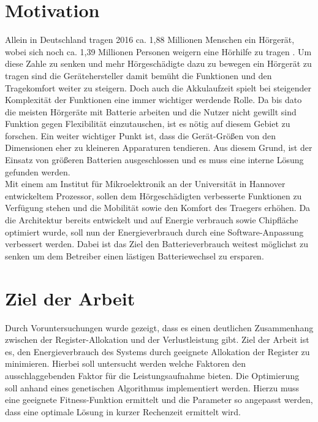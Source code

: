 \section{Motivation}
\label{sec:motivation}
Allein in Deutschland tragen 2016 ca. 1,88 Millionen Menschen ein Hörgerät, wobei sich noch ca. 1,39 Millionen Personen weigern eine Hörhilfe zu tragen  \cite{statistica}. Um diese Zahle zu senken und mehr Hörgeschädigte dazu zu bewegen ein Hörgerät zu tragen sind die Gerätehersteller damit bemüht die Funktionen und den Tragekomfort weiter zu steigern. Doch auch die Akkulaufzeit spielt bei steigender Komplexität der Funktionen eine immer wichtiger werdende Rolle. Da bis dato die meisten Hörgeräte mit Batterie arbeiten und die Nutzer nicht gewillt sind Funktion gegen Flexibilität einzutauschen, ist es nötig auf diesem Gebiet zu forschen. Ein weiter wichtiger Punkt ist, dass die Gerät-Größen von den Dimensionen eher zu kleineren Apparaturen tendieren. Aus diesem Grund, ist der Einsatz von größeren Batterien ausgeschlossen und es muss eine interne Lösung gefunden werden.\\
Mit einem am Institut für Mikroelektronik an der Universität in Hannover entwickeltem Prozessor, sollen dem Hörgeschädigten verbesserte Funktionen zu Verfügung stehen und die Mobilität sowie den Komfort des Traegers erhöhen. Da die Architektur bereits entwickelt und auf Energie verbrauch sowie Chipfläche optimiert wurde, soll nun der Energieverbrauch durch eine Software-Anpassung verbessert werden.
Dabei ist das Ziel den Batterieverbrauch weitest möglichst zu senken um dem Betreiber einen lästigen Batteriewechsel zu ersparen.


\section{Ziel der Arbeit}
\label{sec:ziele}
Durch Voruntersuchungen wurde gezeigt, dass es einen deutlichen Zusammenhang zwischen der Register-Allokation und der Verlustleistung gibt. Ziel der Arbeit ist es, den Energieverbrauch des Systems durch geeignete Allokation der Register zu minimieren. Hierbei soll untersucht werden welche Faktoren den ausschlaggebenden Faktor für die Leistungsaufnahme bieten. Die Optimierung soll anhand eines genetischen Algorithmus implementiert werden. Hierzu muss eine geeignete Fitness-Funktion ermittelt und die Parameter so angepasst werden, dass eine optimale Lösung in kurzer Rechenzeit ermittelt wird.

